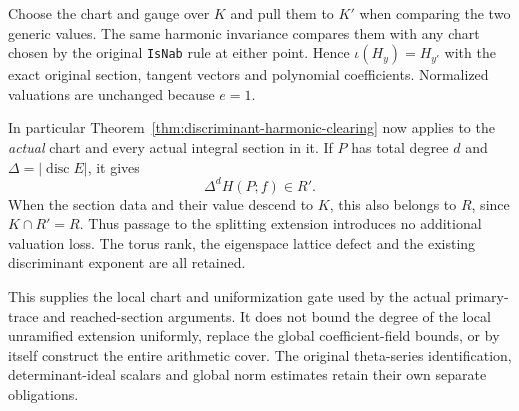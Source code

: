 Choose the chart and gauge over $K$ and pull them to $K'$ when
comparing the two generic values.  The same harmonic invariance
compares them with any chart chosen by the original \texttt{IsNab}
rule at either point.  Hence $\iota(H_y)=H_{y'}$ with the exact
original section, tangent vectors and polynomial coefficients.
Normalized valuations are unchanged because $e=1$.

In particular Theorem~\ref{thm:discriminant-harmonic-clearing}
now applies to the \emph{actual} chart and every actual integral
section in it.  If $P$ has total degree $d$ and
$\Delta=|\operatorname{disc}E|$, it gives
\[
                         \Delta^d H(P;f)\in R'.
\]
When the section data and their value descend to $K$, this also
belongs to $R$, since $K\cap R'=R$.
Thus passage to the splitting extension introduces no additional
valuation loss.  The torus rank, the eigenspace lattice defect and
the existing discriminant exponent are all retained.

This supplies the local chart and uniformization gate used by the
actual primary-trace and reached-section arguments.  It does not
bound the degree of the local unramified extension uniformly, replace
the global coefficient-field bounds, or by itself construct the
entire arithmetic cover.  The original theta-series identification,
determinant-ideal scalars and global norm estimates retain their own
separate obligations.
